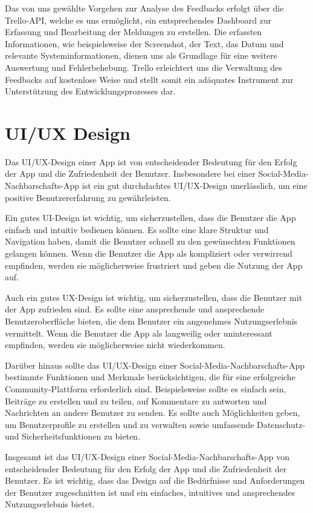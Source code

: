 Das von uns gewählte Vorgehen zur Analyse des Feedbacks erfolgt über die Trello-API, welche es uns ermöglicht, ein entsprechendes Dashboard zur Erfassung und Bearbeitung der Meldungen zu erstellen. Die erfassten Informationen, wie beispielsweise der Screenshot, der Text, das Datum und relevante Systeminformationen, dienen uns als Grundlage für eine weitere Auswertung und Fehlerbehebung. Trello erleichtert uns die Verwaltung des Feedbacks auf kostenlose Weise und stellt somit ein adäquates Instrument zur Unterstützung des Entwicklungsprozesses dar.


\section{UI/UX Design}
Das UI/UX-Design einer App ist von entscheidender Bedeutung für den Erfolg der App und die Zufriedenheit der Benutzer. Insbesondere bei einer Social-Media-Nachbarschafts-App ist ein gut durchdachtes UI/UX-Design unerlässlich, um eine positive Benutzererfahrung zu gewährleisten.

Ein gutes UI-Design ist wichtig, um sicherzustellen, dass die Benutzer die App einfach und intuitiv bedienen können. Es sollte eine klare Struktur und Navigation haben, damit die Benutzer schnell zu den gewünschten Funktionen gelangen können. Wenn die Benutzer die App als kompliziert oder verwirrend empfinden, werden sie möglicherweise frustriert und geben die Nutzung der App auf.

Auch ein gutes UX-Design ist wichtig, um sicherzustellen, dass die Benutzer mit der App zufrieden sind. Es sollte eine ansprechende und ansprechende Benutzeroberfläche bieten, die dem Benutzer ein angenehmes Nutzungserlebnis vermittelt. Wenn die Benutzer die App als langweilig oder uninteressant empfinden, werden sie möglicherweise nicht wiederkommen.

Darüber hinaus sollte das UI/UX-Design einer Social-Media-Nachbarschafts-App bestimmte Funktionen und Merkmale berücksichtigen, die für eine erfolgreiche Community-Plattform erforderlich sind. Beispielsweise sollte es einfach sein, Beiträge zu erstellen und zu teilen, auf Kommentare zu antworten und Nachrichten an andere Benutzer zu senden. Es sollte auch Möglichkeiten geben, um Benutzerprofile zu erstellen und zu verwalten sowie umfassende Datenschutz- und Sicherheitsfunktionen zu bieten.

Insgesamt ist das UI/UX-Design einer Social-Media-Nachbarschafts-App von entscheidender Bedeutung für den Erfolg der App und die Zufriedenheit der Benutzer. Es ist wichtig, dass das Design auf die Bedürfnisse und Anforderungen der Benutzer zugeschnitten ist und ein einfaches, intuitives und ansprechendes Nutzungserlebnis bietet.
